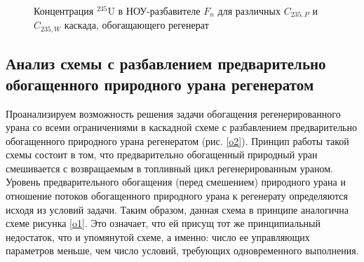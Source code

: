 \begin{figure}[ht]
  \caption{Концентрация $^{235}$U в НОУ-разбавителе $F_n$ для различных $C_{235, P}$ и $C_{235, W}$ каскада, обогащающего регенерат}\label{fig3__7}
\end{figure}

\subsection{Анализ схемы с разбавлением предварительно обогащенного природного урана регенератом}

Проанализируем возможность решения задачи обогащения регенерированного урана со всеми ограничениями в каскадной схеме с разбавлением предварительно обогащенного природного урана регенератом (рис. \ref{o2}). Принцип работы такой схемы состоит в том, что предварительно обогащенный природный уран смешивается с возвращаемым в топливный цикл регенерированным ураном. Уровень предварительного обогащения (перед смешением) природного урана и отношение потоков обогащенного природного урана к регенерату определяются исходя из условий задачи. Таким образом, данная схема в принципе аналогична схеме рисунка \ref{o1}. Это означает, что ей присущ тот же принципиальный недостаток, что и упомянутой схеме, а именно: число ее управляющих параметров меньше, чем число условий, требующих одновременного выполнения. 

